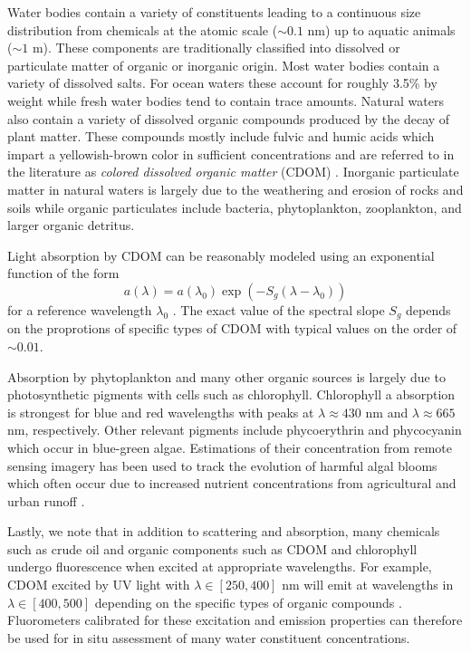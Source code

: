Water bodies contain a variety of constituents leading to a continuous size
distribution from chemicals at the atomic scale ($\sim$$0.1$ nm) up to aquatic
animals ($\sim$$1$ m). These components are traditionally
classified into dissolved or particulate matter of organic or inorganic origin.
Most water bodies contain a variety of dissolved salts. For ocean waters these
account for roughly 3.5\% by weight while fresh water bodies tend to contain
trace amounts. Natural waters also contain a variety of dissolved organic
compounds produced by the decay of plant matter. These compounds mostly include
fulvic and humic acids which impart a yellowish-brown color in sufficient
concentrations and are referred to in the literature as \textit{colored
  dissolved organic matter} (CDOM) \cite{cdom-acids}. Inorganic particulate
matter in natural waters is largely due to the weathering and erosion of rocks
and soils while organic particulates include bacteria, phytoplankton,
zooplankton, and larger organic detritus.

Light absorption by CDOM can be reasonably modeled using an exponential function
of the form
\begin{equation}
  a(\lambda) = a(\lambda_0)\exp(-S_g(\lambda - \lambda_0))
\end{equation}
for a reference wavelength $\lambda_0$ \cite{aurin2018remote}. The exact
value of the spectral slope $S_g$ depends on the proprotions of specific types
of CDOM with typical values on the order of $\sim$$0.01$.

Absorption by phytoplankton and many other organic sources is largely due to
photosynthetic pigments with cells such as chlorophyll. Chlorophyll a
absorption is strongest for blue and red wavelengths with peaks at
$\lambda\approx 430$ nm and $\lambda\approx 665$ nm, respectively. Other
relevant pigments include phycoerythrin and phycocyanin  which occur in
blue-green algae. Estimations of their concentration from remote sensing imagery
has been used to track the evolution of harmful algal blooms which often occur
due to increased nutrient concentrations from agricultural and urban runoff
\cite{algal-blooms-rs}.

Lastly, we note that in addition to scattering and absorption, many chemicals
such as crude oil and organic components such as CDOM and chlorophyll undergo
fluorescence when excited at appropriate wavelengths. For example, CDOM excited
by UV light with $\lambda\in[250, 400]$ nm will emit at wavelengths in
$\lambda\in[400, 500]$ depending on the specific types of organic compounds
\cite{cdom-fluorescence}. Fluorometers calibrated for these excitation
and emission properties can therefore be used for in situ assessment of many
water constituent concentrations.

